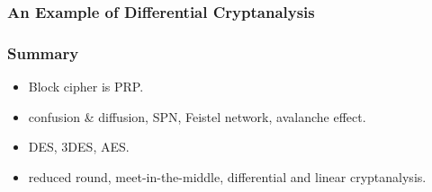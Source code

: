 \begin{frame}\frametitle{An Example of Differential Cryptanalysis}
\begin{figure}
\begin{center}

\end{center}
\end{figure}
\end{frame}
\begin{frame}\frametitle{Summary}
\begin{itemize}
\item Block cipher is PRP.
\item confusion \& diffusion, SPN, Feistel network, avalanche effect.
\item DES, 3DES, AES.
\item reduced round, meet-in-the-middle, differential and linear cryptanalysis. 
\end{itemize}
\end{frame}
